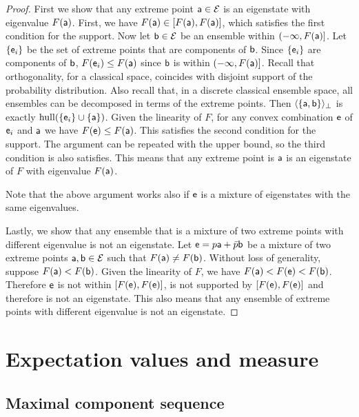 \begin{proof}
	First we show that any extreme point $\ens[a] \in \Ens$ is an eigenstate with eigenvalue $F(\ens[a])$. First, we have $F(\ens[a]) \in [F(\ens[a]), F(\ens[a])]$, which satisfies the first condition for the support. Now let $\ens[b] \in \Ens$ be an ensemble within $(-\infty, F(\ens[a])]$. Let $\{\ens_i\}$ be the set of extreme points that are components of $\ens[b]$. Since $\{\ens_i\}$ are components of $\ens[b]$, $F(\ens_i) \leq F(\ens[a])$ since $\ens[b]$ is within $(-\infty, F(\ens[a])]$. Recall that orthogonality, for a classical space, coincides with disjoint support of the probability distribution. Also recall that, in a discrete classical ensemble space, all ensembles can be decomposed in terms of the extreme points. Then $\langle \{\ens[a], \ens[b]\} \rangle_{\ortho}$ is exactly $\hull(\{\ens_i\} \cup \{\ens[a]\})$. Given the linearity of $F$, for any convex combination $\ens$ of $\ens_i$ and $\ens[a]$ we have $F(\ens) \leq F(\ens[a])$. This satisfies the second condition for the support. The argument can be repeated with the upper bound, so the third condition is also satisfies. This means that any extreme point is $\ens[a]$ is an eigenstate of $F$ with eigenvalue $F(\ens[a])$.
	
	Note that the above argument works also if $\ens$ is a mixture of eigenstates with the same eigenvalues. 
	
	Lastly, we show that any ensemble that is a mixture of two extreme points with different eigenvalue is not an eigenstate.
	Let $\ens = p \ens[a] + \bar{p} \ens[b]$ be a mixture of two extreme points $\ens[a], \ens[b] \in \Ens$ such that $F(\ens[a]) \neq F(\ens[b])$. Without loss of generality, suppose $F(\ens[a]) < F(\ens[b])$. Given the linearity of $F$, we have $F(\ens[a]) < F(\ens) < F(\ens[b])$. Therefore $\ens$ is not within $[F(\ens),F(\ens)]$, is not supported by $[F(\ens),F(\ens)]$ and therefore is not an eigenstate. This also means that any ensemble of extreme points with different eigenvalue is not an eigenstate.
\end{proof}

\section{Expectation values and measure}

\subsection{Maximal component sequence}

